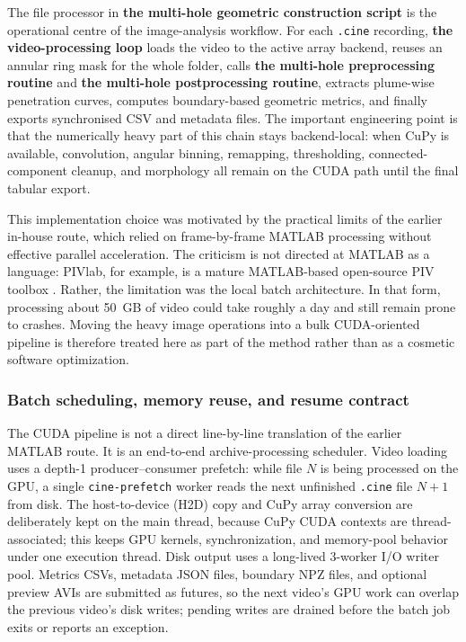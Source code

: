 \documentclass[english, 12pt, a4paper, elec, utf8, a-2b, online]{aaltothesis}
\begin{document}
The file processor in \textbf{the multi-hole geometric construction script} is the operational centre of the image-analysis workflow. For each \texttt{.cine} recording, \textbf{the video-processing loop} loads the video to the active array backend, reuses an annular ring mask for the whole folder, calls \textbf{the multi-hole preprocessing routine} and \textbf{the multi-hole postprocessing routine}, extracts plume-wise penetration curves, computes boundary-based geometric metrics, and finally exports synchronised CSV and metadata files. The important engineering point is that the numerically heavy part of this chain stays backend-local: when CuPy is available, convolution, angular binning, remapping, thresholding, connected-component cleanup, and morphology all remain on the CUDA path until the final tabular export.

This implementation choice was motivated by the practical limits of the earlier in-house route, which relied on frame-by-frame MATLAB processing without effective parallel acceleration. The criticism is not directed at MATLAB as a language: PIVlab, for example, is a mature MATLAB-based open-source PIV toolbox \cite{ThielickeSonntag2021PIVlab}. Rather, the limitation was the local batch architecture. In that form, processing about 50~GB of video could take roughly a day and still remain prone to crashes. Moving the heavy image operations into a bulk CUDA-oriented pipeline is therefore treated here as part of the method rather than as a cosmetic software optimization.

\subsubsection{Batch scheduling, memory reuse, and resume contract}

The CUDA pipeline is not a direct line-by-line translation of the earlier MATLAB route. It is an end-to-end archive-processing scheduler. Video loading uses a depth-1 producer--consumer prefetch: while file \(N\) is being processed on the GPU, a single \texttt{cine-prefetch} worker reads the next unfinished \texttt{.cine} file \(N+1\) from disk. The host-to-device (H2D) copy and CuPy array conversion are deliberately kept on the main thread, because CuPy CUDA contexts are thread-associated; this keeps GPU kernels, synchronization, and memory-pool behavior under one execution thread. Disk output uses a long-lived 3-worker I/O writer pool. Metrics CSVs, metadata JSON files, boundary NPZ files, and optional preview AVIs are submitted as futures, so the next video's GPU work can overlap the previous video's disk writes; pending writes are drained before the batch job exits or reports an exception.
\end{document}
